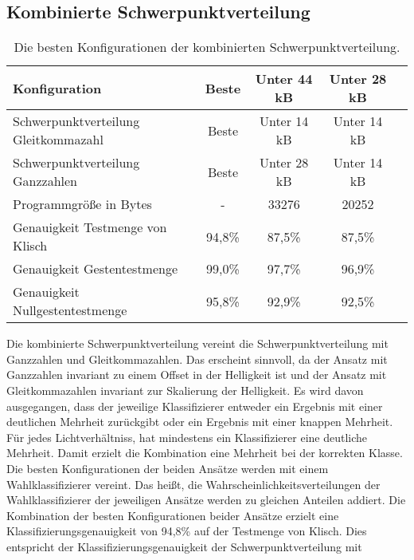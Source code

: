 \subsection{Kombinierte Schwerpunktverteilung}
\begin{table}[h!]
    \centering
    \begin{tabular}{ | l | c | c | c | c |}
        \hline
        Konfiguration & Beste & Unter 44 kB & Unter 28 kB \\\hline
        Schwerpunktverteilung Gleitkommazahl & Beste & Unter 14 kB & Unter 14 kB \\\hline
        Schwerpunktverteilung Ganzzahlen & Beste &  Unter 28 kB & Unter 14 kB \\\hline
        Programmgröße in Bytes & - & 33276 & 20252 \\\hline
        Genauigkeit Testmenge von Klisch & 94,8\% & 87,5\% & 87,5\% \\\hline
        Genauigkeit Gestentestmenge & 99,0\% & 97,7\% & 96,9\% \\\hline
        Genauigkeit Nullgestentestmenge & 95,8\% & 92,9\% & 92,5\% \\\hline
    \end{tabular}
    \caption{Die besten Konfigurationen der kombinierten Schwerpunktverteilung.}
    \label{tab:schwerpunktverteilung_int_and_float}
\end{table}
Die kombinierte Schwerpunktverteilung vereint die Schwerpunktverteilung mit Ganzzahlen und Gleitkommazahlen. Das erscheint sinnvoll, da der Ansatz mit Ganzzahlen invariant zu einem Offset in der
Helligkeit ist und der Ansatz mit Gleitkommazahlen invariant zur Skalierung der Helligkeit.
\newline
\newline
Es wird davon ausgegangen, dass der jeweilige Klassifizierer entweder ein Ergebnis mit einer deutlichen Mehrheit zurückgibt oder ein Ergebnis mit einer knappen Mehrheit. Für jedes Lichtverhältniss, hat mindestens ein
Klassifizierer eine deutliche Mehrheit. Damit erzielt die Kombination eine Mehrheit bei der korrekten Klasse. Die besten Konfigurationen der beiden Ansätze werden mit einem Wahlklassifizierer vereint.
Das heißt, die Wahrscheinlichkeitsverteilungen der Wahlklassifizierer der jeweiligen Ansätze werden zu gleichen Anteilen addiert.
\newline
\newline
Die Kombination der besten Konfigurationen beider Ansätze erzielt eine Klassifizierungsgenauigkeit von 94,8\% auf der Testmenge von Klisch. Dies entspricht der Klassifizierungsgenauigkeit der Schwerpunktverteilung mit
